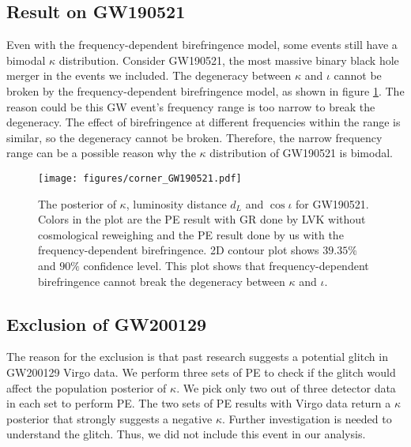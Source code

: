 \documentclass[aps,prd,twocolumn,superscriptaddress,preprintnumbers,floatfix,nofootinbib]{revtex4-2}
\begin{document}
\subsection{Result on GW190521}
Even with the frequency-dependent birefringence model, some events still have a bimodal $\kappa$ distribution.
Consider GW190521, the most massive binary black hole merger in the events we included.
The degeneracy between $\kappa$ and $\iota$ cannot be broken by the frequency-dependent birefringence model, as shown in figure \ref{fig:corner_GW190521}.
The reason could be this GW event's frequency range is too narrow to break the degeneracy.
The effect of birefringence at different frequencies within the range is similar, so the degeneracy cannot be broken.
Therefore, the narrow frequency range can be a possible reason why the $\kappa$ distribution of GW190521 is bimodal.

\begin{figure}[h]
    \texttt{[image: figures/corner\_GW190521.pdf]}
    \caption{
        The posterior of $\kappa$, luminosity distance $d_L$ and $\cos{\iota}$ for GW190521.
        Colors in the plot are the PE result with GR done by LVK without cosmological reweighing \citep{GWTC-2.1, GWTC-3} and the PE result done by us with the frequency-dependent birefringence.
        2D contour plot shows $39.35\%$ and $90\%$ confidence level.
        This plot shows that frequency-dependent birefringence cannot break the degeneracy between $\kappa$ and $\iota$.
    }
    \label{fig:corner_GW190521}
\end{figure}

\subsection{Exclusion of GW200129}
\label{sec:GW200129}
The reason for the exclusion is that past research suggests a potential glitch in GW200129 Virgo data. \citep{GW200129_glitch}
We perform three sets of PE to check if the glitch would affect the population posterior of $\kappa$.
We pick only two out of three detector data in each set to perform PE.
The two sets of PE results with Virgo data return a $\kappa$ posterior that strongly suggests a negative $\kappa$.
Further investigation is needed to understand the glitch.
Thus, we did not include this event in our analysis.

\end{document}

